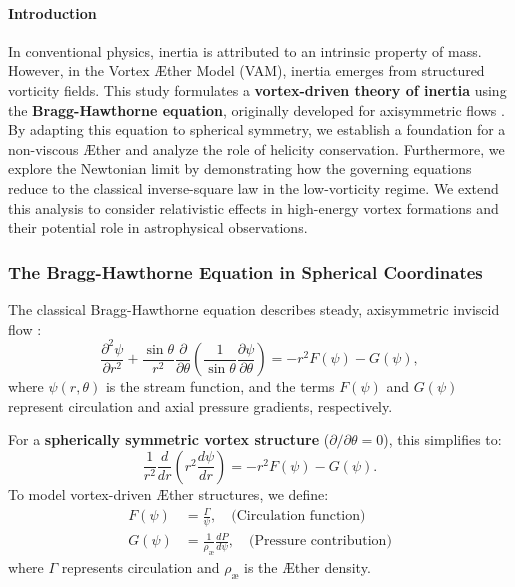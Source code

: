 \documentclass[a4paper,10pt]{article}
\begin{document}
\paragraph*{Introduction}
In conventional physics, inertia is attributed to an intrinsic property of mass. However, in the Vortex Æther Model (VAM), inertia emerges from structured vorticity fields. This study formulates a \textbf{vortex-driven theory of inertia} using the \textbf{Bragg-Hawthorne equation}, originally developed for axisymmetric flows \cite{batchelor1967introduction, saffman1992vortex}. By adapting this equation to spherical symmetry, we establish a foundation for a non-viscous Æther and analyze the role of helicity conservation. Furthermore, we explore the Newtonian limit by demonstrating how the governing equations reduce to the classical inverse-square law in the low-vorticity regime. We extend this analysis to consider relativistic effects in high-energy vortex formations and their potential role in astrophysical observations.

\subsubsection*{The Bragg-Hawthorne Equation in Spherical Coordinates}
The classical Bragg-Hawthorne equation describes steady, axisymmetric inviscid flow \cite{batchelor1967introduction}:
\begin{equation*}
    \frac{\partial^2 \psi}{\partial r^2} + \frac{\sin \theta}{r^2} \frac{\partial}{\partial \theta} \left( \frac{1}{\sin \theta} \frac{\partial \psi}{\partial \theta} \right) = - r^2 F(\psi) - G(\psi),
\end{equation*}
where $\psi(r, \theta)$ is the stream function, and the terms $F(\psi)$ and $G(\psi)$ represent circulation and axial pressure gradients, respectively.

For a \textbf{spherically symmetric vortex structure} ($\partial/\partial\theta = 0$), this simplifies to:
\begin{equation*}
    \frac{1}{r^2} \frac{d}{dr} \left( r^2 \frac{d\psi}{dr} \right) = - r^2 F(\psi) - G(\psi).
\end{equation*}
To model vortex-driven Æther structures, we define:
\begin{align}
    F(\psi) &= \frac{\Gamma}{\psi}, \quad \text{(Circulation function)} \\
    G(\psi) &= \frac{1}{\rho_\text{\ae}} \frac{dP}{d\psi}, \quad \text{(Pressure contribution)}
\end{align}
where $\Gamma$ represents circulation and $\rho_\text{\ae}$ is the Æther density.
\end{document}

